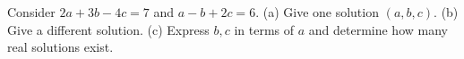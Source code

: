 Consider $2a+3b-4c=7$ and $a-b+2c=6$. (a) Give one solution $(a,b,c)$. (b) Give a different solution. (c) Express $b,c$ in terms of $a$ and determine how many real solutions exist.
